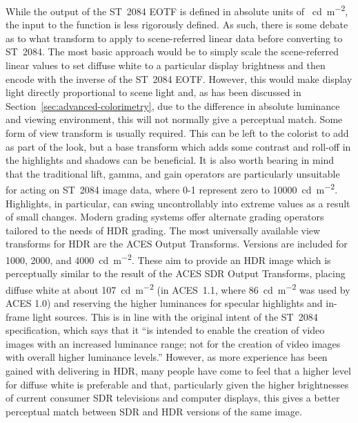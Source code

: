 \begin{figure}[H]
    \label{fig:st2084-eotf}
\end{figure}

While the output of the ST~2084 EOTF is defined in absolute units of \SI{}{\candela\per\metre\squared}, the input to the function is less rigorously defined.
As such, there is some debate as to what transform to apply to scene-referred linear data before converting to ST~2084.
The most basic approach would be to simply scale the scene-referred linear values to set diffuse white to a particular display brightness and then encode with the inverse of the ST~2084 EOTF.
However, this would make display light directly proportional to scene light and, as has been discussed in Section~\ref{sec:advanced-colorimetry}, due to the difference in absolute luminance and viewing environment, this will not normally give a perceptual match.
Some form of view transform is usually required.
This can be left to the colorist to add as part of the look, but a base transform which adds some contrast and roll-off in the highlights and shadows can be beneficial.
It is also worth bearing in mind that the traditional lift, gamma, and gain operators are particularly unsuitable for acting on ST~2084 image data, where 0-1 represent zero to \SI{10000}{\candela\per\metre\squared}.
Highlights, in particular, can swing uncontrollably into extreme values as a result of small changes.
Modern grading systems offer alternate grading operators tailored to the needs of HDR grading.
\ccPar{}
The most universally available view transforms for HDR are the ACES Output Transforms.
Versions are included for 1000, 2000, and \SI{4000}{\candela\per\metre\squared}.
These aim to provide an HDR image which is perceptually similar to the result of the ACES SDR Output Transforms, placing diffuse white at about \SI{107}{\candela\per\metre\squared} (in ACES~1.1, where \SI{86}{\candela\per\metre\squared} was used by ACES 1.0) and reserving the higher luminances for specular highlights and in-frame light sources.
This is in line with the original intent of the ST~2084 specification, which says that it ``is intended to enable the creation of video images with an increased luminance range; not for the creation of video images with overall higher luminance levels.'' However, as more experience has been gained with delivering in HDR, many people have come to feel that a higher level for diffuse white is preferable and that, particularly given the higher brightnesses of current consumer SDR televisions and computer displays, this gives a better perceptual match between SDR and HDR versions of the same image.
